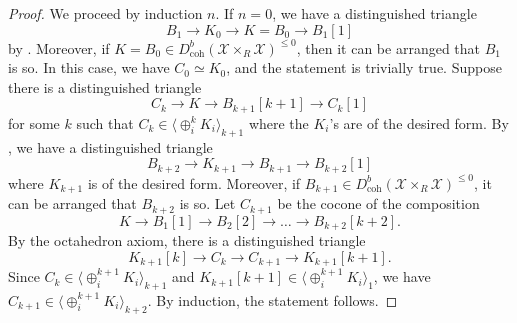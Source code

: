 \documentclass[10pt,a4paper]{amsart}
\begin{document}
\begin{proof}
    We proceed by induction $n$. If $n=0$, we have a distinguished triangle
    \begin{displaymath}
        B_1\longrightarrow K_0\longrightarrow K=B_0\longrightarrow B_1[1]
    \end{displaymath}
    by . Moreover, if $K=B_0\in D_{\operatorname{coh}}^b(\mathcal{X}\times_R\mathcal{X})^{\leq 0}$, then it can be arranged that $B_1$ is so. In this case, we have $C_0\simeq K_0$, and the statement is trivially true. Suppose there is a distinguished triangle
    \begin{displaymath}
        C_k\longrightarrow K\longrightarrow B_{k+1}[k+1]\longrightarrow C_k[1]
    \end{displaymath}
    for some $k$ such that $C_k\in\langle\oplus_i^{k} K_i \rangle_{k+1}$ where the $K_i$'s are of the desired form. By , we have a distinguished triangle
    \begin{displaymath}
        B_{k+2}\longrightarrow K_{k+1}\longrightarrow B_{k+1}\longrightarrow B_{k+2}[1]
    \end{displaymath}
    where $K_{k+1}$ is of the desired form. Moreover, if $B_{k+1}\in D_{\operatorname{coh}}^b(\mathcal{X}\times_R\mathcal{X})^{\leq 0}$, it can be arranged that $B_{k+2}$ is so. Let $C_{k+1}$ be the cocone of the composition
    \begin{displaymath}
        K\to B_1[1]\to B_2[2]\to\ldots\to B_{k+2}[k+2].
    \end{displaymath}
    By the octahedron axiom, there is a distinguished triangle
    \begin{displaymath}
        K_{k+1}[k]\longrightarrow C_{k}\longrightarrow C_{k+1}\longrightarrow K_{k+1}[k+1].
    \end{displaymath}
    Since $C_k\in\langle\oplus_i^{k+1} K_i\rangle_{k+1}$ and $K_{k+1}[k+1]\in\langle\oplus_i^{k+1} K_i\rangle_{1}$, we have $C_{k+1}\in\langle\oplus_i^{k+1} K_i\rangle_{k+2}$. By induction, the statement follows.
\end{proof}
\end{document}
